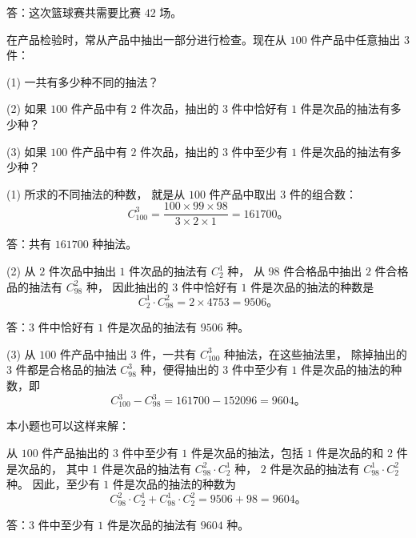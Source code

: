 答：这次篮球赛共需要比赛 $42$ 场。


\liti 在产品检验时，常从产品中抽出一部分进行检查。现在从 $100$ 件产品中任意抽出 $3$ 件：

(1) 一共有多少种不同的抽法？

(2) 如果 $100$ 件产品中有 $2$ 件次品，抽出的 $3$ 件中恰好有 $1$ 件是次品的抽法有多少种？

(3) 如果 $100$ 件产品中有 $2$ 件次品，抽出的 $3$ 件中至少有 $1$ 件是次品的抽法有多少种？


\jie  (1) 所求的不同抽法的种数， 就是从 $100$ 件产品中取出 $3$ 件的组合数：
$$ C_{100}^3 = \dfrac{100 \times 99 \times 98}{3 \times 2 \times 1} = 161700 \text{。} $$

答：共有 $161700$ 种抽法。

(2) 从 $2$ 件次品中抽出 $1$ 件次品的抽法有 $C_2^1$ 种，
从 $98$ 件合格品中抽出 $2$ 件合格品的抽法有 $C_{98}^2$ 种，
因此抽出的 $3$ 件中恰好有 $1$ 件是次品的抽法的种数是
$$ C_2^1 \cdot C_{98}^2 = 2 \times 4753 = 9506 \text{。} $$

答：$3$ 件中恰好有 $1$ 件是次品的抽法有 $9506$ 种。

(3) 从 $100$ 件产品中抽出 $3$ 件，一共有 $C_{100}^3$ 种抽法，在这些抽法里，
除掉抽出的 $3$ 件都是合格品的抽法 $C_{98}^3$ 种，便得抽出的 $3$ 件中至少有 $1$ 件是次品的抽法的种数，即
$$ C_{100}^3 - C_{98}^3 = 161700 - 152096 = 9604 \text{。} $$

本小题也可以这样来解：

从 $100$ 件产品抽出的 $3$ 件中至少有 $1$ 件是次品的抽法，包括 $1$ 件是次品的和 $2$ 件是次品的，
其中 1 件是次品的抽法有 $C_{98}^2 \cdot C_2^1$ 种，
$2$ 件是次品的抽法有 $C_{98}^1 \cdot C_2^2$ 种。
因此，至少有 $1$ 件是次品的抽法的种数为
$$ C_{98}^2 \cdot C_2^1 + C_{98}^1 \cdot C_2^2 = 9506 + 98 = 9604 \text{。} $$

答：$3$ 件中至少有 $1$ 件是次品的抽法有 $9604$ 种。



